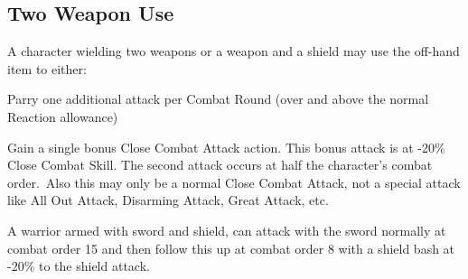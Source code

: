 \subsection{Two Weapon Use}
A character wielding two weapons or a weapon and a shield may use the off-hand item to either: 
\begin{rpg-list}
\item Parry one additional attack per Combat Round (over and above the normal Reaction allowance)
\item Gain a single bonus Close Combat Attack action. This bonus attack is at -20\% Close Combat Skill. The second attack occurs at half the character’s combat order. Also this may only be a normal Close Combat Attack, not a special attack like All Out Attack, Disarming Attack, Great Attack, etc.
\end{rpg-list}

\begin{rpg-examplebox}
	A warrior armed with sword and shield, can attack with the sword normally at combat order 15 and then follow this up at combat order 8 with a shield bash at -20\% to the shield attack.
\end{rpg-examplebox}






